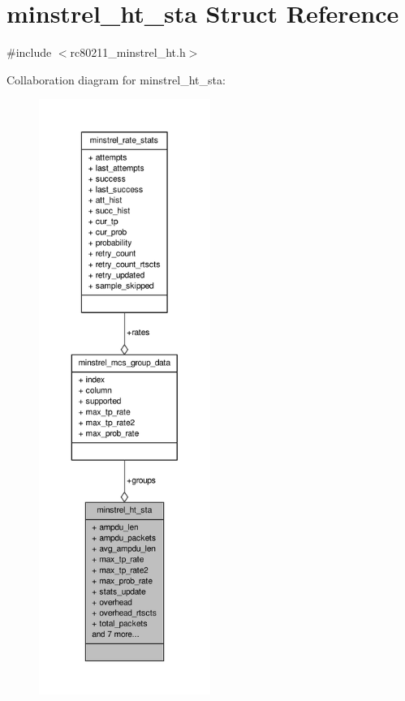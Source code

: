\hypertarget{structminstrel__ht__sta}{\section{minstrel\-\_\-ht\-\_\-sta Struct Reference}
\label{structminstrel__ht__sta}
}


{\ttfamily \#include $<$rc80211\-\_\-minstrel\-\_\-ht.\-h$>$}



Collaboration diagram for minstrel\-\_\-ht\-\_\-sta\-:
\nopagebreak
\begin{figure}[H]
\begin{center}
\leavevmode
\includegraphics[height=550pt]{structminstrel__ht__sta__coll__graph}
\end{center}
\end{figure}
